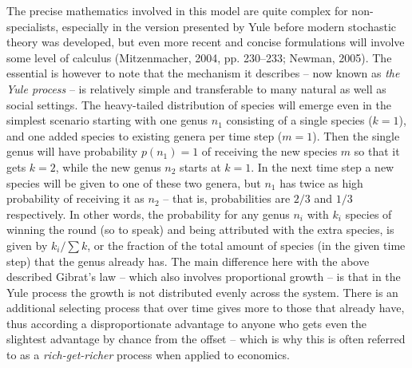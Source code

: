 \documentclass[
  12pt,
]{book}
\begin{document}
The precise mathematics involved in this model are quite complex for non-specialists, especially in the version presented by Yule before modern stochastic theory was developed, but even more recent and concise formulations will involve some level of calculus (Mitzenmacher, 2004, pp. 230--233; Newman, 2005). The essential is however to note that the mechanism it describes -- now known as \emph{the Yule process} -- is relatively simple and transferable to many natural as well as social settings. The heavy-tailed distribution of species will emerge even in the simplest scenario starting with one genus \(n_1\) consisting of a single species (\(k = 1\)), and one added species to existing genera per time step (\(m = 1\)). Then the single genus will have probability \(p(n_1) = 1\) of receiving the new species \(m\) so that it gets \(k = 2\), while the new genus \(n_2\) starts at \(k = 1\). In the next time step a new species will be given to one of these two genera, but \(n_1\) has twice as high probability of receiving it as \(n_2\) -- that is, probabilities are \(2/3\) and \(1/3\) respectively. In other words, the probability for any genus \(n_{i}\) with \(k_i\) species of winning the round (so to speak) and being attributed with the extra species, is given by \(k_i/\sum{k}\), or the fraction of the total amount of species (in the given time step) that the genus already has. The main difference here with the above described Gibrat's law -- which also involves proportional growth -- is that in the Yule process the growth is not distributed evenly across the system. There is an additional selecting process that over time gives more to those that already have, thus according a disproportionate advantage to anyone who gets even the slightest advantage by chance from the offset -- which is why this is often referred to as a \emph{rich-get-richer} process when applied to economics.
\end{document}
